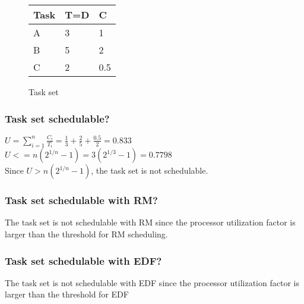         \renewcommand{\arraystretch}{1.4}
        \begin{figure}[H]
        \centering
        \begin{minipage}{0.5\textwidth}
            \begin{table}[H]
            \centering
            \begin{tabular}{|l|l|l|}
                \hline
                \textbf{Task}   & \textbf{T=D}  & \textbf{C}  \\ \hline
                A               & 3             & 1           \\ \hline
                B               & 5             & 2           \\ \hline
                C               & 2             & 0.5         \\ \hline

            \end{tabular}
            \end{table}
        \end{minipage}%
        \caption{Task set}
        \label{fig:Taskset}
        \end{figure}
    \renewcommand{\arraystretch}{1.0}

        \subsubsection{Task set schedulable?}
        $U = \sum_{i=1}^{n} \frac{C_i}{T_i} = \frac{1}{3} + \frac{2}{5} + \frac{0.5}{2} = 0.833$ \\
        $U <= n(2^{1/n} - 1) = 3(2^{1/3} - 1) = 0.7798$ \\
        Since $U > n(2^{1/n} - 1)$, the task set is not schedulable.

        \subsubsection{Task set schedulable with RM?}
        The task set is not schedulable with RM since the processor utilization factor is larger than the threshold for RM scheduling. 

        \subsubsection{Task set schedulable with EDF?}
        The task set is not schedulable with EDF since the processor utilization factor is larger than the threshold for EDF

